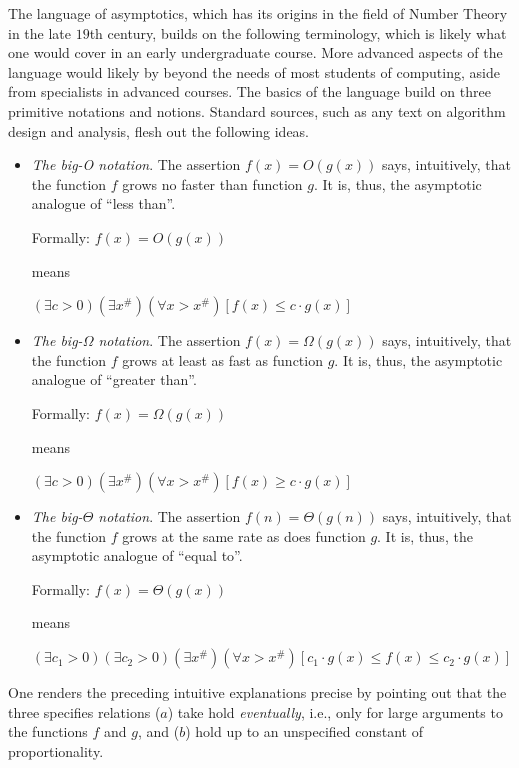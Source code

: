 The language of asymptotics, which has its origins in the field of
Number Theory in the late $19$th century, builds on the following
terminology, which is likely what one would cover in an early
undergraduate course.  More advanced aspects of the language would
likely by beyond the needs of most students of computing, aside from
specialists in advanced courses.  The basics of the language build on
three primitive notations and notions.  Standard sources, such as any
text on algorithm design and analysis, flesh out the following ideas.
\begin{itemize}
\item
{\em The big-O notation}.
%
The assertion $f(x) = O(g(x))$ says, intuitively, that the function
$f$ grows no faster than function $g$.  It is, thus, the asymptotic
analogue of ``less than''.

Formally:
$f(x) = O(g(x))$

means

$(\exists c >0)(\exists x^{\#})(\forall x > x^{\#})
[f(x) \leq c \cdot g(x)]$

\item
{\em The big-$\Omega$ notation}.
%
The assertion $f(x) = \Omega(g(x))$ says, intuitively, that the
function $f$ grows at least as fast as function $g$.  It is, thus, the
asymptotic analogue of ``greater than''.

Formally:
$f(x) = \Omega(g(x))$

means

$(\exists c >0)(\exists x^{\#})(\forall x > x^{\#})
[f(x) \geq c \cdot  g(x)]$ \\

\item
{\em The big-$\Theta$ notation}.
%
The assertion $f(n) = \Theta(g(n))$ says, intuitively, that the
function $f$ grows at the same rate as does function $g$.  It is,
thus, the asymptotic analogue of ``equal to''.

Formally:
$f(x) = \Theta(g(x))$

means

$(\exists c_1 >0)(\exists c_2 >0)(\exists x^{\#})(\forall x > x^{\#})
[c_1 \cdot g(x) \leq f(x) \leq c_2 \cdot  g(x)]$
\end{itemize}
One renders the preceding intuitive explanations precise by pointing
out that the three specifies relations ($a$) take hold {\em
  eventually}, i.e., only for large arguments to the functions $f$ and
$g$, and ($b$) hold up to an unspecified constant of proportionality.

